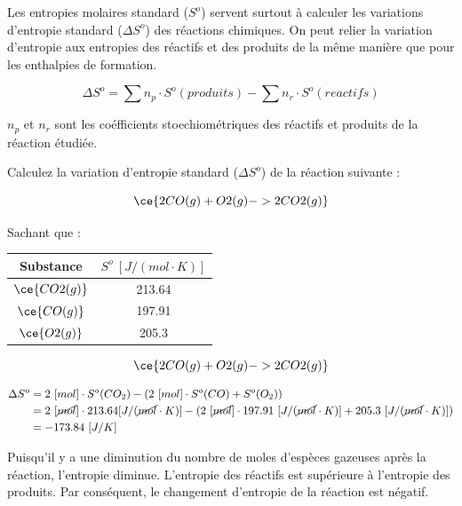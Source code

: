 \documentclass[
  11pt,
  a4paper,
  openany]{book}
\begin{document}
\clearpage

Les entropies molaires standard (\(S^{o}\)) servent surtout à calculer les variations d'entropie standard (\(\Delta S^{o}\)) des réactions chimiques. On peut relier la variation d'entropie aux entropies des réactifs et des produits de la même manière que pour les enthalpies de formation.

\[
\Delta S^o = \sum n_p \cdot S^{o}(produits) - \sum n_r \cdot S^{o}(reactifs)
\]

\(n_p\) et \(n_r\) sont les coéfficients stoechiométriques des réactifs et produits de la réaction étudiée.

\begin{Exercise}
Calculez la variation d'entropie standard (\(\Delta S^o\)) de la réaction suivante :

\[ \ce{2 CO(g) + O2(g) -> 2CO2(g)} \]

Sachant que :

\end{Exercise}

\begin{longtable}[]{@{}cc@{}}
\toprule\noalign{}
Substance & \(S^o\ [J/(mol \cdot K)]\) \\
\midrule\noalign{}
\endhead
\bottomrule\noalign{}
\endlastfoot
\(\ce{CO2(g)}\) & 213.64 \\
\(\ce{CO(g)}\) & 197.91 \\
\(\ce{O2(g)}\) & 205.3 \\
\end{longtable}


\begin{Answer}

\[ \ce{2 CO(g) + O2(g) -> 2CO2(g)} \]

\[
\begin{split}
\Delta S^o &= 2\ [mol] \cdot S^o(CO_2) - ( 2\ [mol] \cdot S^o(CO) + S^o(O_2) ) \\
&= 2\ [\cancel{mol}] \cdot 213.64 [J/(\cancel{mol} \cdot K)] - ( 2\ [\cancel{mol}] \cdot 197.91\ [J/(\cancel{mol} \cdot K)] + 205.3\ [J/(\cancel{mol} \cdot K)] ) \\
&= -173.84\ [J/K]
\end{split}
\]

Puisqu'il y a une diminution du nombre de moles d'espèces gazeuses après la réaction, l'entropie diminue. L'entropie des réactifs est supérieure à l'entropie des produits. Par conséquent, le changement d'entropie de la réaction est négatif.

\clearpage

\end{Answer}
\end{document}
